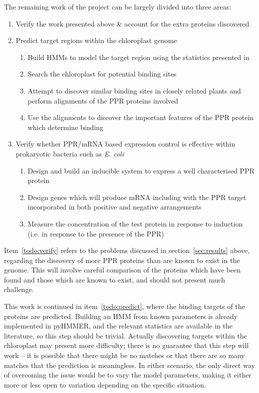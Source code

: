 \documentclass[twoside,a4paper]{article}
\begin{document}
\begin{multicols}{2}
The remaining work of the project can be largely divided into three areas:
\begin{enumerate}
  \item Verify the work presented above \& account for the extra proteins
    discovered \label{todo:verify}
  \item Predict target regions within the chloroplast genome
    \label{todo:predict}
    \begin{enumerate}
      \item Build HMMs to model the target region using the statistics
        presented in \cite{Barkan2012}
      \item Search the chloroplast for potential binding sites
      \item Attempt to discover similar binding sites in closely related plants
        and perform alignments of the PPR proteins involved
      \item Use the alignments to discover the important features of the PPR
        protein which determine binding
    \end{enumerate}
  \item Verify whether PPR/mRNA based expression control is effective within
    prokaryotic bacteria such as \textit{E. coli}
    \label{todo:wet}
    \begin{enumerate}
      \item Design and build an inducible system to express a well 
        characterised PPR protein
      \item Design genes which will produce mRNA including with the PPR target
        incorporated in both positive and negative arrangements
      \item Measure the concentration of the test protein in response to
        induction (i.e. in response to the presence of the PPR)
    \end{enumerate}
\end{enumerate}

Item~\ref{todo:verify} refers to the problems discussed in 
section~\ref{sec:results} above, regarding the discovery of more PPR proteins 
than are known to exist in the genome.
This will involve careful comparison of the proteins which have been found and
those which are known to exist, and should not present much challenge.

This work is continued in item~\ref{todo:predict}, where the binding targets of
the proteins are predicted.
Building an HMM from known parameters is already implemented in pyHMMER, and
the relevant statistics are available in the literature\cite{Barkan2012}, so
this step should be trivial.
Actually discovering targets within the chloroplast may present more
difficulty; there is no guarantee that this step will work -- it is possible
that there might be no matches or that there are so many matches that the
prediction is meaningless.
In either scenario, the only direct way of overcoming the issue would be to
vary the model parameters, making it either more or less open to variation
depending on the specific situation.


\end{multicols}
\end{document}
